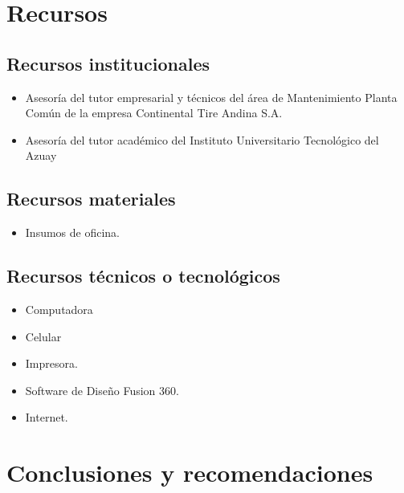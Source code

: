\documentclass[11pt]{article}
\begin{document}
    \section{Recursos}
 
        \subsection{Recursos institucionales}
            \begin{itemize}
                \item Asesoría del tutor empresarial y técnicos del área de Mantenimiento Planta Común
                de la empresa Continental Tire Andina S.A.

                \item Asesoría del tutor académico del Instituto Universitario Tecnológico del Azuay
            \end{itemize}
  
        \subsection{Recursos materiales}
            \begin{itemize}
                \item Insumos de oficina.
            \end{itemize}
  
        \subsection{Recursos técnicos o tecnológicos}
            \begin{itemize}
                \item Computadora
                \item Celular
                \item Impresora.
                \item Software de Diseño Fusion 360.
                \item Internet.
            \end{itemize}
 
  
    \section{Conclusiones y recomendaciones}
\end{document}

